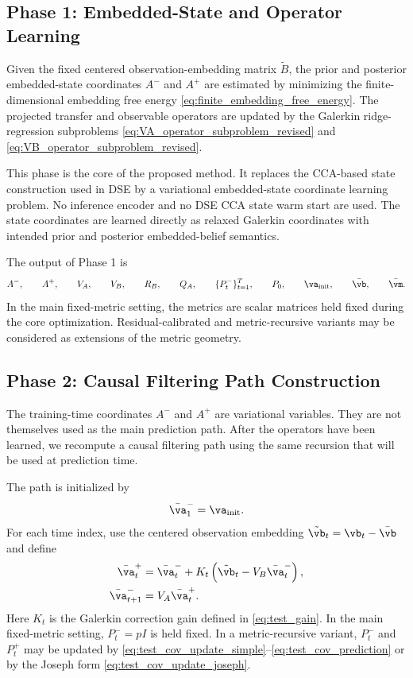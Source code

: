 \documentclass[twoside,11pt]{article}
\begin{document}
\subsection{Phase 1: Embedded-State and Operator Learning}

Given the fixed centered observation-embedding matrix $\tilde B$, the
prior and posterior embedded-state coordinates $A^-$ and $A^+$ are
estimated by minimizing the finite-dimensional embedding free energy
\eqref{eq:finite_embedding_free_energy}. The projected transfer and
observable operators are updated by the Galerkin ridge-regression
subproblems \eqref{eq:VA_operator_subproblem_revised} and
\eqref{eq:VB_operator_subproblem_revised}.

This phase is the core of the proposed method. It replaces the
CCA-based state construction used in DSE by a variational
embedded-state coordinate learning problem. No inference encoder and no
DSE CCA state warm start are used. The state coordinates are learned
directly as relaxed Galerkin coordinates with intended prior and
posterior embedded-belief semantics.

The output of Phase 1 is
\begin{align}
A^-,
\qquad
A^+,
\qquad
V_A,
\qquad
V_B,
\qquad
R_B,
\qquad
Q_A,
\qquad
\{P_t^-\}_{t=1}^T,
\qquad
P_0,
\qquad
\va_{\mathrm{init}},
\qquad
\bar{\vb},
\qquad
\bar{\vm}.
\label{eq:phase1_outputs}
\end{align}
In the main fixed-metric setting, the metrics are scalar matrices held
fixed during the core optimization. Residual-calibrated and
metric-recursive variants may be considered as extensions of the metric
geometry.

\subsection{Phase 2: Causal Filtering Path Construction}

The training-time coordinates $A^-$ and $A^+$ are variational variables.
They are not themselves used as the main prediction path. After the
operators have been learned, we recompute a causal filtering path using
the same recursion that will be used at prediction time.

The path is initialized by
\begin{align}
\bar{\va}_1^-
=
\va_{\mathrm{init}}.
\label{eq:phase2_initial_prior}
\end{align}
For each time index, use the centered observation embedding
$\tilde{\vb}_t=\vb_t-\bar{\vb}$ and define
\begin{align}
\bar{\va}_t^+
&=
\bar{\va}_t^-
+
K_t
\left(
\tilde{\vb}_t - V_B\bar{\va}_t^-
\right),
\label{eq:phase2_posterior}
\\
\bar{\va}_{t+1}^-
&=
V_A\bar{\va}_t^+.
\label{eq:phase2_prior}
\end{align}
Here $K_t$ is the Galerkin correction gain defined in
\eqref{eq:test_gain}. In the main fixed-metric setting, $P_t^-=pI$ is
held fixed. In a metric-recursive variant, $P_t^-$ and $P_t^+$ may be
updated by \eqref{eq:test_cov_update_simple}--\eqref{eq:test_cov_prediction}
or by the Joseph form \eqref{eq:test_cov_update_joseph}.
\end{document}
